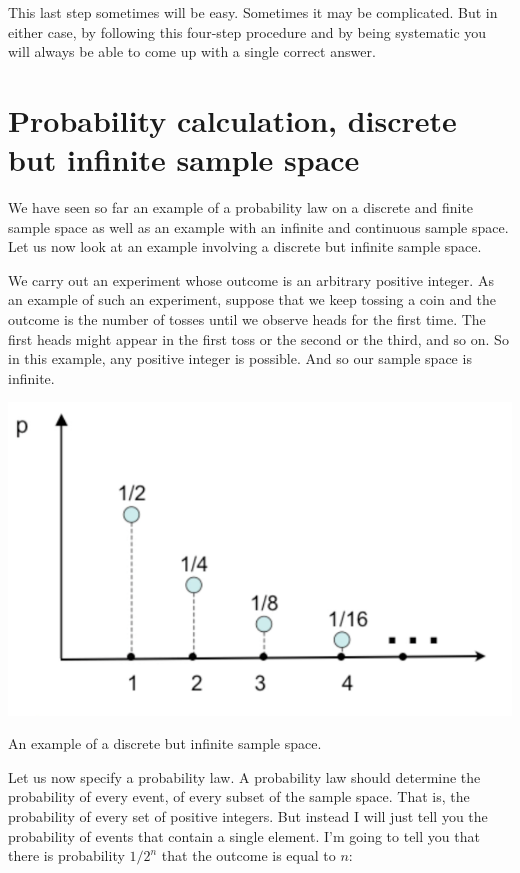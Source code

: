 \documentclass{tufte-handout}
\begin{document}
This last step sometimes will be easy. Sometimes it may be complicated. But in either case, by following
this four-step procedure and by being systematic you will always be able to come up with a single
correct answer.

\pagebreak
\section{Probability calculation, discrete but infinite sample space}\label{sec:continuous-example}

We have seen so far an example of a probability law on a discrete and finite sample space as well as
an example with an infinite and continuous sample space. Let us now look at an example involving a
discrete but infinite sample space.

We carry out an experiment whose outcome is an arbitrary positive integer. As an example of such an
experiment, suppose that we keep tossing a coin and the outcome is the number of tosses until we
observe heads for the first time. The first heads might appear in the first toss or the second or the third,
and so on. So in this example, any positive integer is possible. And so our sample space is infinite.


\begin{marginfigure}
  \includegraphics{InfiniteSampleSpace}
  \caption{An example of a discrete but infinite sample space.}
\end{marginfigure}

Let us now specify a probability law. A probability law should determine the probability of every event, of
every subset of the sample space. That is, the probability of every set of positive integers. But instead I
will just tell you the probability of events that contain a single element. I'm going to tell you that there is
probability $1/2^n$ that the outcome is equal to $n$:
\end{document}
